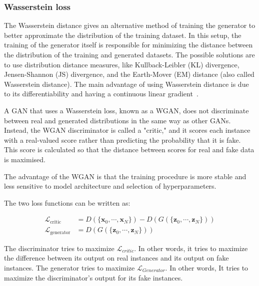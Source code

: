 \documentclass[sn-mathphys-num]{sn-jnl}%
\newcommand{\svec}[1]{\{\ensuremath{\vec{#1}_0, \cdots, \vec{#1}_N}\}}
\renewcommand\vec{\mathbf}
\begin{document}
\subsubsection{Wasserstein loss}
    The Wasserstein distance gives an alternative method of training the generator to better approximate the distribution of the training dataset. In this setup, the training of the generator itself is responsible for minimizing the distance between the distribution of the training and generated datasets. The possible solutions are to use distribution distance measures, like Kullback-Leibler (KL) divergence, Jensen-Shannon (JS) divergence, and the Earth-Mover (EM) distance (also called Wasserstein distance). The main advantage of using Wasserstein distance is due to its differentiability and having a continuous linear gradient~\cite{Wasserstein}.
    
    
    A GAN that uses a Wasserstein loss, known as a WGAN, does not discriminate between real and generated distributions in the same way as other GANs. Instead, the WGAN discriminator is called a "critic," and it scores each instance with a real-valued score rather than predicting the probability that it is fake. This score is calculated so that the distance between scores for real and fake data is maximised.
    
    The advantage of the WGAN is that the training procedure is more stable and less sensitive to model architecture and selection of hyperparameters.
    
    The two loss functions can be written as: 

\begin{equation}
    \begin{aligned}
        \mathcal{L}_{\text{critic}} &= D(\svec{x}) - D(G(\svec{z})) \\
        \mathcal{L}_{\text{generator}} &= D(G(\svec{z}))
    \end{aligned}
\end{equation}

    \bigskip
    The discriminator tries to maximize $\mathcal{L}_{critic}$. In other words, it tries to maximize the difference between its output on real instances and its output on fake instances. The generator tries to maximize $\mathcal{L}_{Generator}$. In other words, It tries to maximize the discriminator's output for its fake instances.
\end{document}

